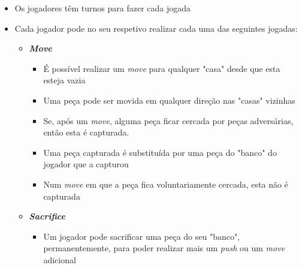 \documentclass[a4paper]{article}
\begin{document}
\begin{itemize}
	\item Os jogadores têm turnos para fazer cada jogada
	\item Cada jogador pode no seu respetivo realizar cada uma das seguintes jogadas:
			\begin{itemize}
				\item[] \textbf{\textit{Move}}
				\begin{itemize}
					\item É possível realizar um \textit{move} para qualquer "casa" desde que esta esteja vazia
					\item Uma peça pode ser movida em qualquer direção nas "casas" vizinhas
					\item Se, após um \textit{move}, alguma peça ficar cercada por peças adversárias, então esta é capturada.
					\item Uma peça capturada é substituída por uma peça do "banco" do jogador que a capturou
					\item Num \textit{move} em que a peça fica voluntariamente cercada, esta não é capturada
				\end{itemize}
				\item[] \textbf{\textit{Sacrifice}}
				\begin{itemize}
					\item Um jogador pode sacrificar uma peça do seu "banco", permanentemente, para poder realizar mais um \textit{push} ou um \textit{move} adicional

\end{itemize}
\end{itemize}
\end{itemize}
\end{document}
